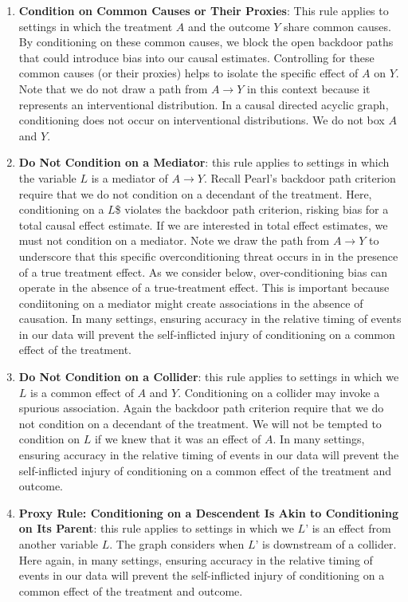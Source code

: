 \documentclass[
  single column]{article}
\begin{document}
\begin{enumerate}
\def\labelenumi{\arabic{enumi}.}
\setcounter{enumi}{1}
\item
  \textbf{Condition on Common Causes or Their Proxies}: This rule
  applies to settings in which the treatment \(A\) and the outcome \(Y\)
  share common causes. By conditioning on these common causes, we block
  the open backdoor paths that could introduce bias into our causal
  estimates. Controlling for these common causes (or their proxies)
  helps to isolate the specific effect of \(A\) on \(Y\). Note that we
  do not draw a path from \(A \to Y\) in this context because it
  represents an interventional distribution. In a causal directed
  acyclic graph, conditioning does not occur on interventional
  distributions. We do not box \(A\) and \(Y\).
\item
  \textbf{Do Not Condition on a Mediator}: this rule applies to settings
  in which the variable \(L\) is a mediator of \(A \to Y\). Recall
  Pearl's backdoor path criterion require that we do not condition on a
  decendant of the treatment. Here, conditioning on a \(L\)\$ violates
  the backdoor path criterion, risking bias for a total causal effect
  estimate. If we are interested in total effect estimates, we must not
  condition on a mediator. Note we draw the path from \(A \to Y\) to
  underscore that this specific overconditioning threat occurs in in the
  presence of a true treatment effect. As we consider below,
  over-conditioning bias can operate in the absence of a true-treatment
  effect. This is important because condiitoning on a mediator might
  create associations in the absence of causation. In many settings,
  ensuring accuracy in the relative timing of events in our data will
  prevent the self-inflicted injury of conditioning on a common effect
  of the treatment.
\item
  \textbf{Do Not Condition on a Collider}: this rule applies to settings
  in which we \(L\) is a common effect of \(A\) and \(Y\). Conditioning
  on a collider may invoke a spurious association. Again the backdoor
  path criterion require that we do not condition on a decendant of the
  treatment. We will not be tempted to condition on \(L\) if we knew
  that it was an effect of \(A\). In many settings, ensuring accuracy in
  the relative timing of events in our data will prevent the
  self-inflicted injury of conditioning on a common effect of the
  treatment and outcome.
\item
  \textbf{Proxy Rule: Conditioning on a Descendent Is Akin to
  Conditioning on Its Parent}: this rule applies to settings in which we
  \(L’\) is an effect from another variable \(L\). The graph considers
  when \(L’\) is downstream of a collider. Here again, in many settings,
  ensuring accuracy in the relative timing of events in our data will
  prevent the self-inflicted injury of conditioning on a common effect
  of the treatment and outcome.
\end{enumerate}
\end{document}
